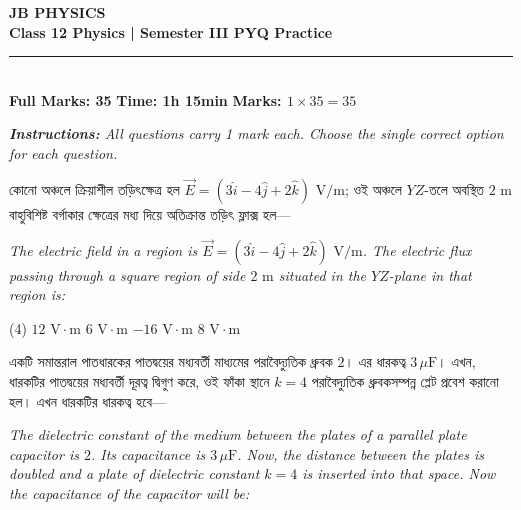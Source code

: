 \documentclass[13pt,a4paper]{extarticle}
\newcommand{\questionheader}[1]{%
  \vspace{0.4cm}\noindent{\Large\textbf{#1}}\vspace{0.12cm}%
}
\begin{document}
\begin{center}
  {\Huge \textbf{JB PHYSICS}}\\[4pt]
  {\LARGE \textbf{Class 12 Physics | Semester III PYQ Practice}}\\[4pt]
  \rule{\textwidth}{1.2pt}\\[4pt]
  \textbf{\large Full Marks: 35} \hfill \textbf{\large Time: 1h 15min} \hfill \textbf{\large Marks: $1 \times 35 = 35$}
\end{center}

\vspace{0.2cm}
\noindent\textit{\textbf{\large Instructions:} All questions carry 1 mark each. Choose the single correct option for each question.}
\vspace{0.3cm}


\questionheader{Question 1}

{\bengalifont কোনো অঞ্চলে ক্রিয়াশীল তড়িৎক্ষেত্র হল $\vec{E} = (3\hat{i} - 4\hat{j} + 2\hat{k})\text{ V/m}$; ওই অঞ্চলে $YZ$-তলে অবস্থিত $2\text{ m}$ বাহুবিশিষ্ট বর্গাকার ক্ষেত্রের মধ্য দিয়ে অতিক্রান্ত তড়িৎ ফ্লাক্স হল—}

\vspace{0.08cm}
\textit{The electric field in a region is $\vec{E} = (3\hat{i} - 4\hat{j} + 2\hat{k})\text{ V/m}$. The electric flux passing through a square region of side $2\text{ m}$ situated in the $YZ$-plane in that region is:}

\begin{tasks}(4)
  \task $12\text{ V}\cdot\text{m}$
  \task $6\text{ V}\cdot\text{m}$
  \task $-16\text{ V}\cdot\text{m}$
  \task $8\text{ V}\cdot\text{m}$
\end{tasks}

\questionheader{Question 2}

{\bengalifont একটি সমান্তরাল পাতধারকের পাতদ্বয়ের মধ্যবর্তী মাধ্যমের পরাবৈদ্যুতিক ধ্রুবক $2$। এর ধারকত্ব $3\,\mu\text{F}$। এখন, ধারকটির পাতদ্বয়ের মধ্যবর্তী দূরত্ব দ্বিগুণ করে, ওই ফাঁকা স্থানে $k = 4$ পরাবৈদ্যুতিক ধ্রুবকসম্পন্ন প্লেট প্রবেশ করানো হল। এখন ধারকটির ধারকত্ব হবে—}

\vspace{0.08cm}
\textit{The dielectric constant of the medium between the plates of a parallel plate capacitor is $2$. Its capacitance is $3\,\mu\text{F}$. Now, the distance between the plates is doubled and a plate of dielectric constant $k = 4$ is inserted into that space. Now the capacitance of the capacitor will be:}
\end{document}
